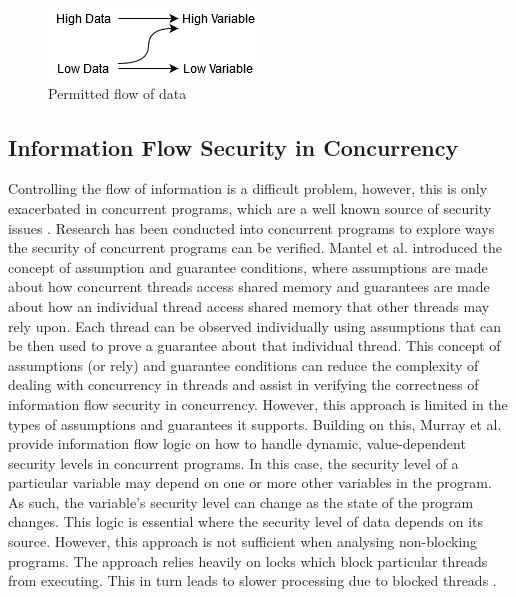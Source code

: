 \documentclass[twocolumn]{article}
\begin{document}
\begin{figure}
    \includegraphics{flow.png}
    \caption{Permitted flow of data}
    \label{fig:flow}
\end{figure}

\subsection{Information Flow Security in Concurrency}
Controlling the flow of information is a difficult problem, however, this is only exacerbated in concurrent programs, which are a well known source of security issues \cite{mantel2014noninterference}\cite{smith2019value}\cite{vaughan2012secure}. Research has been conducted into concurrent programs to explore ways the security of concurrent programs can be verified. Mantel et al. \cite{mantel2011assumptions} introduced the concept of assumption and guarantee conditions, where assumptions are made about how concurrent threads access shared memory and guarantees are made about how an individual thread access shared memory that other threads may rely upon. Each thread can be observed individually using assumptions that can be then used to prove a guarantee about that individual thread. This concept of assumptions (or rely) and guarantee conditions can reduce the complexity of dealing with concurrency in threads and assist in verifying the correctness of information flow security in concurrency. However, this approach is limited in the types of assumptions and guarantees it supports. Building on this, Murray et al. \cite{ernst2019seccsl} \cite{murray2018covern} provide information flow logic on how to handle dynamic, value-dependent security levels in concurrent programs. In this case, the security level of a particular variable may depend on one or more other variables in the program. As such, the variable's security level can change as the state of the program changes. This logic is essential where the security level of data depends on its source. However, this approach is not sufficient when analysing non-blocking programs. The approach relies heavily on locks which block particular threads from executing. This in turn leads to slower processing due to blocked threads \cite{prakash1991non}.
\end{document}
